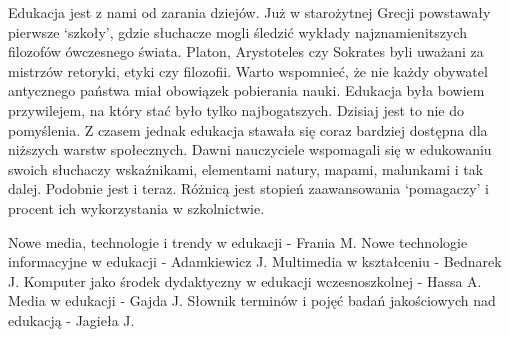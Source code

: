 \documentclass{article}
\begin{document}
Edukacja jest z nami od zarania dziejów. Już w starożytnej Grecji powstawały pierwsze ‘szkoły’, gdzie słuchacze mogli śledzić wykłady najznamienitszych filozofów ówczesnego świata. Platon, Arystoteles czy Sokrates byli uważani za mistrzów retoryki, etyki czy filozofii. Warto wspomnieć, że nie każdy obywatel antycznego państwa miał obowiązek pobierania nauki. Edukacja była bowiem przywilejem, na który stać było tylko najbogatszych. Dzisiaj jest to nie do pomyślenia. Z czasem jednak edukacja stawała się coraz bardziej dostępna dla niższych warstw społecznych. Dawni nauczyciele wspomagali się w edukowaniu swoich słuchaczy wskaźnikami, elementami natury, mapami, malunkami i tak dalej. Podobnie jest i teraz. Różnicą jest stopień zaawansowania ‘pomagaczy’ i procent ich wykorzystania w szkolnictwie.





\newpage %
\renewcommand\refname{\section*{Bibliografia}}
\begin{thebibliography}{11}\linespread{1}\normalsize{
	Nowe media, technologie i trendy w edukacji - Frania M.
	Nowe technologie informacyjne w edukacji - Adamkiewicz J.
	Multimedia w kształceniu - Bednarek J.
	Komputer jako środek dydaktyczny w edukacji wczesnoszkolnej - Hassa A.
	Media w edukacji - Gajda J.
	Słownik terminów i pojęć badań jakościowych nad edukacją - Jagieła J.
}
\end{thebibliography}
\end{document}
